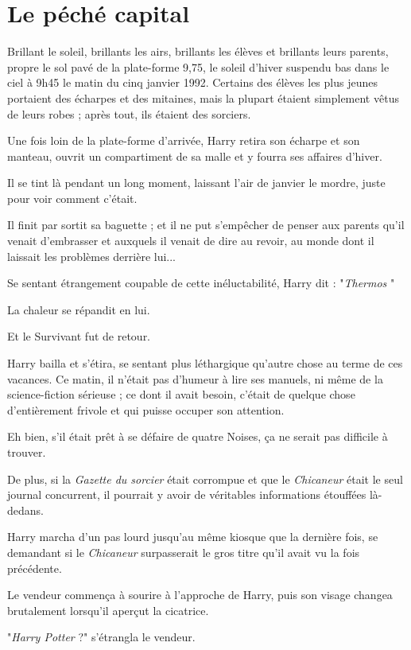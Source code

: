 
\chapter{Le péché capital}

Brillant le soleil, brillants les airs, brillants les élèves et brillants leurs parents, propre le sol pavé de la plate-forme 9,75, le soleil d'hiver suspendu bas dans le ciel à 9h45 le matin du cinq janvier 1992. Certains des élèves les plus jeunes portaient des écharpes et des mitaines, mais la plupart étaient simplement vêtus de leurs robes ; après tout, ils étaient des sorciers.

Une fois loin de la plate-forme d'arrivée, Harry retira son écharpe et son manteau, ouvrit un compartiment de sa malle et y fourra ses affaires d'hiver.

Il se tint là pendant un long moment, laissant l'air de janvier le mordre, juste pour voir comment c'était.

Il finit par sortit sa baguette ; et il ne put s'empêcher de penser aux parents qu'il venait d'embrasser et auxquels il venait de dire au revoir, au monde dont il laissait les problèmes derrière lui...

Se sentant étrangement coupable de cette inéluctabilité, Harry dit : "\emph{Thermos} "

La chaleur se répandit en lui.

Et le Survivant fut de retour.

Harry bailla et s'étira, se sentant plus léthargique qu'autre chose au terme de ces vacances. Ce matin, il n'était pas d'humeur à lire ses manuels, ni même de la science-fiction sérieuse ; ce dont il avait besoin, c'était de quelque chose d'entièrement frivole et qui puisse occuper son attention.

Eh bien, s'il était prêt à se défaire de quatre Noises, ça ne serait pas difficile à trouver.

De plus, si la \emph{Gazette du sorcier}  était corrompue et que le \emph{Chicaneur}  était le seul journal concurrent, il pourrait y avoir de véritables informations étouffées là-dedans.

Harry marcha d'un pas lourd jusqu'au même kiosque que la dernière fois, se demandant si le \emph{Chicaneur } surpasserait le gros titre qu'il avait vu la fois précédente.

Le vendeur commença à sourire à l'approche de Harry, puis son visage changea brutalement lorsqu'il aperçut la cicatrice.

"\emph{Harry Potter}  ?" s'étrangla le vendeur.

